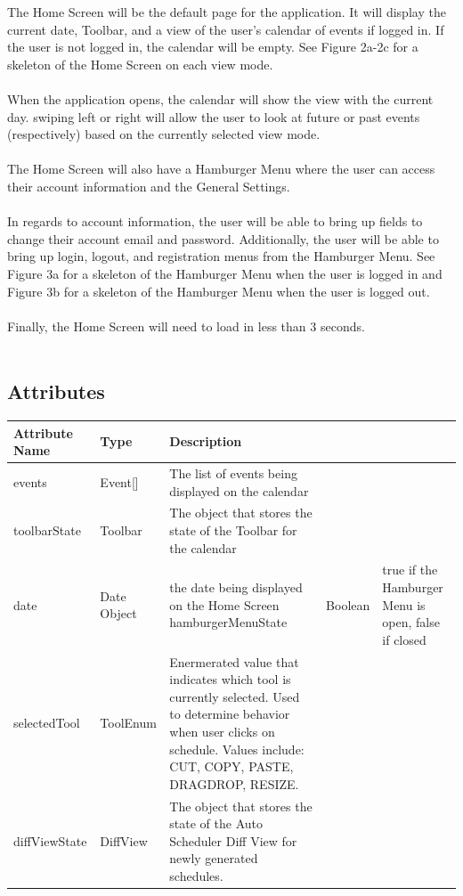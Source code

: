 \documentclass{scrreprt}
\begin{document}
The Home Screen will be the default page for the application.  It will display the current date, Toolbar, and a view of the user's calendar of events if logged in.  If the user is not logged in, the calendar will be empty. See Figure 2a-2c for a skeleton of the Home Screen on each view mode.\\
\\
When the application opens, the calendar will show the view with the current day.  swiping left or right will allow the user to look at future or past events (respectively) based on the currently selected view mode.\\
\\
The Home Screen will also have a Hamburger Menu where the user can access their account information and the General Settings.\\
\\
In regards to account information, the user will be able to bring up fields to change their account email and password.  Additionally, the user will be able to bring up login, logout, and registration menus from the Hamburger Menu.  See Figure 3a for a skeleton of the Hamburger Menu when the user is logged in and Figure 3b for a skeleton of the Hamburger Menu when the user is logged out.\\
\\
Finally, the Home Screen will need to load in less than 3 seconds. \\
\\

\subsection{Attributes}

\begin{center}
\begin{longtable}{ | p{5cm} | p{5cm} | p{5cm} | }
\hline
\textbf{Attribute Name} & \textbf{Type} & \textbf{Description} \\
\hline
events & Event[] & The list of events being displayed on the calendar \\
\hline
toolbarState & Toolbar & The object that stores the state of the Toolbar for the calendar \\
\hline
date & Date Object & the date being displayed on the Home Screen
\hline
hamburgerMenuState & Boolean & true if the Hamburger Menu is open, false if closed \\
\hline
selectedTool & ToolEnum & Enermerated value that indicates which tool is currently selected. Used to determine behavior when user clicks on schedule. Values include: CUT, COPY, PASTE, DRAGDROP, 
RESIZE.\\
\hline
diffViewState & DiffView & The object that stores the state of the Auto Scheduler Diff View for newly generated schedules.\\
\hline
\end{longtable}
\end{center}
\end{document}
